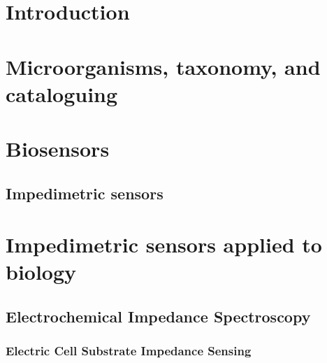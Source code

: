 \documentclass{ucetd}
\date{12 août 2022}
\title{\thesistitle}
\author{\thesisauthor}
\begin{document}
\maketitle

\makecopyright
\makededication
\makeepigraph


\tableofcontents
\listoffigures

\acknowledgments

\abstract


\mainmatter

\chapter{Introduction}


\chapter{Microorganisms, taxonomy, and cataloguing}


\chapter{Biosensors}
\label{chap:Biosensors}

\section{Impedimetric sensors}


\chapter{Impedimetric sensors applied to biology}
\label{chap:ImpedimetricSensors}

\section{Electrochemical Impedance Spectroscopy}
\label{sec:EIS}

\subsection{Electric Cell Substrate Impedance Sensing}

\end{document}
